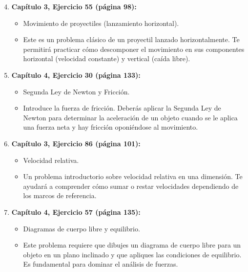 \documentclass[12pt]{article}
\begin{document}
\begin{enumerate}
\setcounter{enumi}{3}
    \item \textbf{Capítulo 3, Ejercicio 55 (página 98):}
    \begin{itemize}
        \item[\textbf{Tema:}] Movimiento de proyectiles (lanzamiento horizontal).
        \item[\textbf{Descripción:}] Este es un problema clásico de un proyectil lanzado horizontalmente. Te permitirá practicar cómo descomponer el movimiento en sus componentes horizontal (velocidad constante) y vertical (caída libre).
    \end{itemize} 

    \item \textbf{Capítulo 4, Ejercicio 30 (página 133):}
    \begin{itemize}
        \item[\textbf{Tema:}] Segunda Ley de Newton y Fricción.
        \item[\textbf{Descripción:}] Introduce la fuerza de fricción. Deberás aplicar la Segunda Ley de Newton para determinar la aceleración de un objeto cuando se le aplica una fuerza neta y hay fricción oponiéndose al movimiento.
    \end{itemize} 

    \item \textbf{Capítulo 3, Ejercicio 86 (página 101):}
    \begin{itemize}
        \item[\textbf{Tema:}] Velocidad relativa.
        \item[\textbf{Descripción:}] Un problema introductorio sobre velocidad relativa en una dimensión. Te ayudará a comprender cómo sumar o restar velocidades dependiendo de los marcos de referencia.
    \end{itemize} 

    \item \textbf{Capítulo 4, Ejercicio 57 (página 135):}
    \begin{itemize}
        \item[\textbf{Tema:}] Diagramas de cuerpo libre y equilibrio.
        \item[\textbf{Descripción:}] Este problema requiere que dibujes un diagrama de cuerpo libre para un objeto en un plano inclinado y que apliques las condiciones de equilibrio. Es fundamental para dominar el análisis de fuerzas.
    \end{itemize} 
\end{enumerate}
\end{document}
